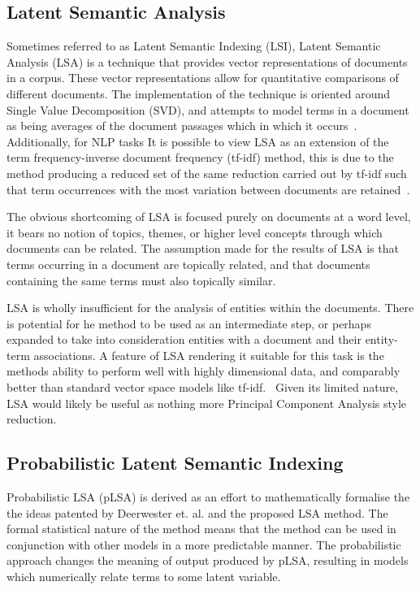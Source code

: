 \documentclass[10pt]{report}
\begin{document}
\subsection{Latent Semantic Analysis}
Sometimes referred to as Latent Semantic Indexing (LSI), Latent Semantic Analysis (LSA) is a technique that provides vector representations of documents in a corpus. These vector representations allow for quantitative comparisons of different documents. The implementation of the technique is oriented around Single Value Decomposition (SVD), and attempts to model terms in a document as being averages of the document passages which in which it occurs~\cite{Deerwester1989-yl}. Additionally, for NLP tasks It is possible to view LSA as an extension of the term frequency-inverse document frequency (tf-idf) method, this is due to the method producing a reduced set of the same reduction carried out by tf-idf such that term occurrences with the most variation between documents are retained~\cite{Landauer1998-kx}.

The obvious shortcoming of LSA is focused purely on documents at a word level, it bears no notion of topics, themes, or higher level concepts through which documents can be related. The assumption made for the results of LSA is that terms occurring in a document are topically related, and that documents containing the same terms must also topically similar.

LSA is wholly insufficient for the analysis of entities within the documents. There is potential for he method to be used as an intermediate step, or perhaps expanded to take into consideration entities with a document and their entity-term associations. A feature of LSA rendering it suitable for this task is the methods ability to perform well with highly dimensional data, and comparably better than standard vector space models like tf-idf.~\cite{Kumar2004-da} Given its limited nature, LSA would likely be useful as nothing more Principal Component Analysis style reduction.

\subsection{Probabilistic Latent Semantic Indexing}
Probabilistic LSA (pLSA) is derived as an effort to mathematically formalise the the ideas patented by Deerwester et. al. and the proposed LSA method. The formal statistical nature of the method means that the method can be used in conjunction with other models in a more predictable manner. The probabilistic approach changes the meaning of output produced by pLSA, resulting in models which numerically relate terms to some latent variable. 
\end{document}
